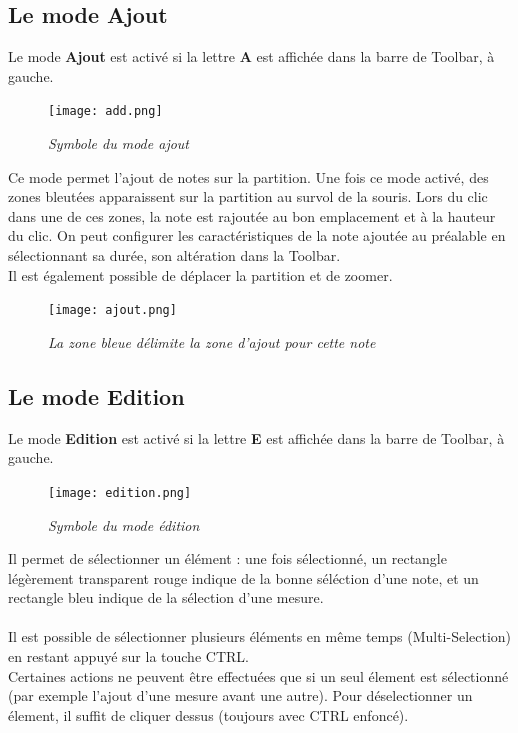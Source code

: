 \documentclass[12pt]{report}
\begin{document}
\subsection{Le mode Ajout}
Le mode \textbf{Ajout} est activé si la lettre \textbf{A} est affichée dans la barre de Toolbar, à gauche.\\
\begin{figure}[H]
  \centering
  \texttt{[image: add.png]}\\
    \caption{\textit{Symbole du mode ajout}}
\end{figure}
Ce mode permet l'ajout de notes sur la partition. Une fois ce mode activé, des zones bleutées apparaissent sur la partition au survol de la souris. 
Lors du clic dans une de ces zones, la note est rajoutée
au bon emplacement et à la hauteur du clic. On peut configurer les caractéristiques de la note ajoutée au préalable en sélectionnant sa durée, son altération dans la Toolbar. \\
Il est également possible de déplacer la partition et de zoomer.
\begin{figure}[H]
  \centering
  \texttt{[image: ajout.png]}\\
    \caption{\textit{La zone bleue délimite la zone d'ajout pour cette note}}
\end{figure}
\vskip 0.2in

\subsection{Le mode Edition}
Le mode \textbf{Edition} est activé si la lettre \textbf{E} est affichée dans la barre de Toolbar, à gauche.\\
\begin{figure}[H]
  \centering
  \texttt{[image: edition.png]}\\
    \caption{\textit{Symbole du mode édition}}
\end{figure}
Il permet de sélectionner un élément : une fois sélectionné, un rectangle légèrement transparent rouge indique de la bonne séléction d'une note, et un rectangle bleu indique 
de la sélection d'une mesure.\\ \\
Il est possible de sélectionner plusieurs éléments en même temps (Multi-Selection) en restant appuyé sur la touche CTRL. \\
Certaines actions ne peuvent être effectuées que si un seul élement est sélectionné
(par exemple l'ajout d'une mesure avant une autre). Pour déselectionner un élement, il suffit de cliquer dessus (toujours avec CTRL enfoncé).\\
\end{document}
